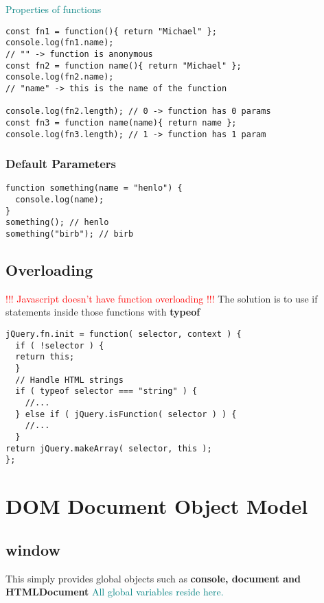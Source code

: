 \documentclass[main.tex,fontsize=6pt,paper=a4,paper=landscape,DIV=calc,]{scrartcl}
\begin{document}
\begin{multicols*}{4}
  \textcolor{teal}{Properties of functions}
\vspace{-2mm}
\begin{lstlisting}
const fn1 = function(){ return "Michael" };
console.log(fn1.name);
// "" -> function is anonymous
const fn2 = function name(){ return "Michael" };
console.log(fn2.name);
// "name" -> this is the name of the function

console.log(fn2.length); // 0 -> function has 0 params
const fn3 = function name(name){ return name };
console.log(fn3.length); // 1 -> function has 1 param
\end{lstlisting}
\vspace{2mm}

\subsubsection{Default Parameters}
\vspace{-2mm}
\begin{lstlisting}
function something(name = "henlo") {
  console.log(name);
}
something(); // henlo
something("birb"); // birb
\end{lstlisting}
\vspace{2mm}

\subsection{Overloading}
 \textcolor{red}{!!! Javascript doesn't have function overloading !!!}\newline
 The solution is to use if statements inside those functions with \textbf{typeof}
\vspace{-2mm}
\begin{lstlisting}
jQuery.fn.init = function( selector, context ) {
  if ( !selector ) {
  return this;
  }
  // Handle HTML strings
  if ( typeof selector === "string" ) {
    //...
  } else if ( jQuery.isFunction( selector ) ) {
    //...
  }
return jQuery.makeArray( selector, this );
};
\end{lstlisting}
\vspace{2mm}

\section{DOM Document Object Model}

\subsection{window}  
This simply provides global objects such as \textbf{console, document and HTMLDocument}\newline
\textcolor{teal}{All global variables reside here.}


\end{multicols*}
\end{document}
